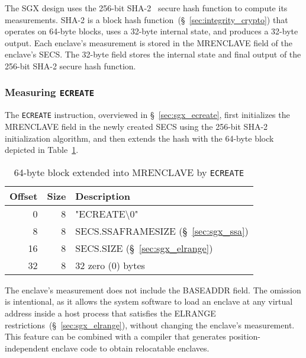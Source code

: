 
The SGX design uses the 256-bit SHA-2~\cite{fips2015shs} secure hash function
to compute its measurements. SHA-2 is a block hash
function~(\S~\ref{sec:integrity_crypto}) that operates on 64-byte blocks, uses
a 32-byte internal state, and produces a 32-byte output. Each enclave's
measurement is stored in the MRENCLAVE field of the enclave's SECS. The 32-byte
field stores the internal state and final output of the 256-bit SHA-2 secure
hash function.


\subsubsection{Measuring \texttt{ECREATE}}
\label{sec:sgx_ecreate_mrenclave}


The \texttt{ECREATE} instruction, overviewed in \S~\ref{sec:sgx_ecreate},
first initializes the MRENCLAVE field in the newly created SECS using the
256-bit SHA-2 initialization algorithm, and then extends the hash with
the 64-byte block depicted in Table~\ref{fig:ecreate_mrenclave}.

\begin{table}[hbt]
  \centering
  \begin{tabularx}{\columnwidth}{| r | r | X |}
  \hline
  \textbf{Offset} & \textbf{Size} & \textbf{Description}\\
  \hline
  0 & 8 & "ECREATE\textbackslash{}0" \\
  \hline
  8 & 8 & SECS.SSAFRAMESIZE (\S~\ref{sec:sgx_ssa}) \\
  \hline
  16 & 8 & SECS.SIZE (\S~\ref{sec:sgx_elrange}) \\
  \hline
  32 & 8 & 32 zero (0) bytes \\
  \hline
  \end{tabularx}
  \caption{
    64-byte block extended into MRENCLAVE by \texttt{ECREATE}
  }
  \label{fig:ecreate_mrenclave}
\end{table}

The enclave's measurement does not include the BASEADDR field. The omission is
intentional, as it allows the system software to load an enclave at any virtual
address inside a host process that satisfies the ELRANGE
restrictions~(\S~\ref{sec:sgx_elrange}), without changing the enclave's
measurement. This feature can be combined with a compiler that generates
position-independent enclave code to obtain relocatable enclaves.

